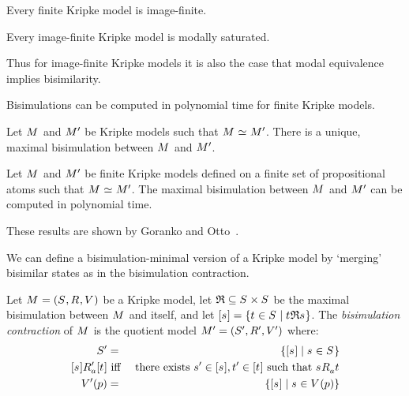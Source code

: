 \begin{proposition}
Every finite Kripke model is image-finite.
\end{proposition}

\begin{proposition}
Every image-finite Kripke model is modally saturated.
\end{proposition}

Thus for image-finite Kripke models it is also the case that modal equivalence implies bisimilarity.

Bisimulations can be computed in polynomial time for finite Kripke models.

\begin{proposition}
Let $\kModel$ and ${M^{\prime}_{}}$ be Kripke models such that $\kModel \bisimilar \kModelP$.
There is a unique, maximal bisimulation between $\kModel$ and ${M^{\prime}_{}}$.
\end{proposition}

\begin{proposition}
Let $\kModel$ and ${M^{\prime}_{}}$ be finite Kripke models defined on a finite set of propositional atoms such that $\kModel \bisimilar \kModelP$.
The maximal bisimulation between $\kModel$ and ${M^{\prime}_{}}$ can be computed in polynomial time.
\end{proposition}

These results are shown by Goranko and Otto~\cite{goranko:2006}.

We can define a bisimulation-minimal version of a Kripke model by `merging' bisimilar states as in the bisimulation contraction.

\begin{definition}
Let $\kModelAndTuple$ be a Kripke model,
let $\bisimulation \subseteq \kStates \times \kStates$ be the maximal bisimulation between $\kModel$ and itself,
and let ${[\kStateS]} = \{\kStateT \in \kStates \mid \kStateT \bisimulation \kStateS\}$.
The {\em bisimulation contraction} of $\kModel$ is the quotient model $\kModelAndTupleP$ where:
\begin{eqnarray*}
    \kStatesP &=& \{{[\kStateS]} \mid \kStateS \in \kStates\}\\
    {[\kStateS]} \kAccessibilityPA {[\kStateT]} &\text{ iff }& \text{there exists } \kStateSP \in {[\kStateS]}, \kStateTP \in {[\kStateT]} \text{ such that } \kStateS \kAccessibilityA \kStateT\\
    \kValuationP(\atomP) &=& \{{[\kStateS]} \mid \kStateS \in \kValuation(\atomP)\}
\end{eqnarray*}
\end{definition}

